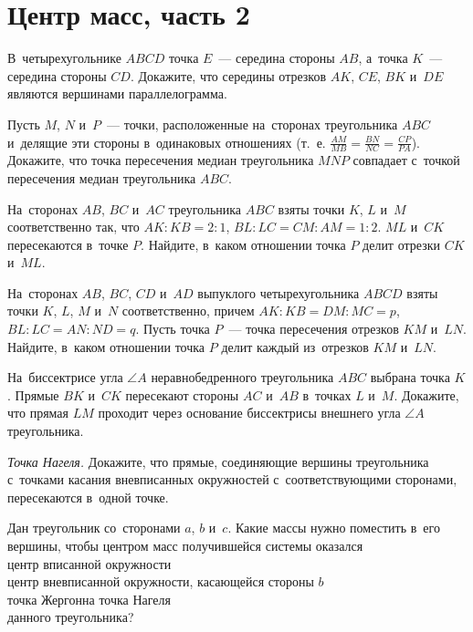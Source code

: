 

\section*{Центр масс, часть 2}


\begin{problems}

\item
В~четырехугольнике $ABCD$ точка $E$~--- середина стороны $AB$,
а~точка $K$~--- середина стороны $CD$.
Докажите, что середины отрезков $AK$, $CE$, $BK$ и~$DE$ являются вершинами
параллелограмма.

\item
Пусть $M$, $N$ и~$P$~--- точки, расположенные на~сторонах треугольника $ABC$
и~делящие эти стороны в~одинаковых отношениях
(т.~е. $\frac{AM}{MB} = \frac{BN}{NC} = \frac{CP}{PA}$).
Докажите, что точка пересечения медиан треугольника $MNP$ совпадает с~точкой
пересечения медиан треугольника $ABC$.

\item
На~сторонах $AB$, $BC$ и~$AC$ треугольника $ABC$ взяты точки $K$, $L$ и~$M$
соответственно так, что $AK : KB = 2 : 1$, $BL : LC = CM : AM = 1 : 2$.
$ML$ и~$CK$ пересекаются в~точке $P$.
Найдите, в~каком отношении точка $P$ делит отрезки $CK$ и~$ML$.

\item
На~сторонах $AB$, $BC$, $CD$ и~$AD$ выпуклого четырехугольника $ABCD$ взяты
точки $K$, $L$, $M$ и~$N$ соответственно, причем $AK : KB = DM : MC = p$,
$BL : LC = AN : ND = q$.
Пусть точка $P$~--- точка пересечения отрезков $KM$ и~$LN$.
Найдите, в~каком отношении точка $P$ делит каждый из~отрезков $KM$ и~$LN$.

\item
На~биссектрисе угла $\angle{A}$ неравнобедренного треугольника $ABC$ выбрана
точка $K$.
Прямые $BK$ и~$CK$ пересекают стороны $AC$ и~$AB$ в~точках $L$ и~$M$.
Докажите, что прямая $LM$ проходит через основание биссектрисы внешнего угла
$\angle A$ треугольника.

\item\emph{Точка Нагеля.}
Докажите, что прямые, соединяющие вершины треугольника с~точками касания
вневписанных окружностей с~соответствующими сторонами, пересекаются в~одной
точке.

\item
Дан треугольник со~сторонами $a$, $b$ и~$c$.
Какие массы нужно поместить в~его вершины, чтобы центром масс получившейся
системы оказался
\\
\sbp центр вписанной окружности
\\
\sbp центр вневписанной окружности, касающейся стороны $b$
\\
\sbp точка Жергонна
\qquad
\sbp точка Нагеля
\\
данного треугольника?


\end{problems}
